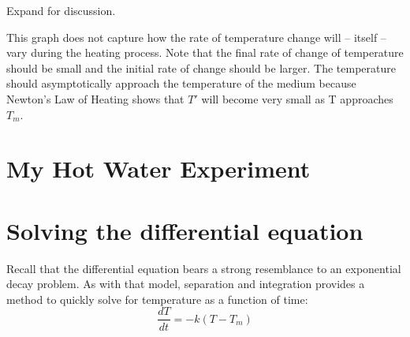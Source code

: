 \documentclass{ximera}
\begin{document}
\begin{problem}
\begin{center}  
\end{center}

Expand for discussion.

 \begin{expandable}
    This graph does not capture how the rate of temperature change will – itself – vary during the heating process.  Note that the final rate of change of temperature should be small and the initial rate of change should be larger.  The temperature should asymptotically approach the temperature of the medium because Newton's Law of Heating shows that $T'$ will become very small as T approaches $T_m$.
  \end{expandable}
 
\end{problem}

\section*{My Hot Water Experiment}

\begin{center}  
\end{center}

\section*{Solving the differential equation}

Recall that the differential equation bears a strong resemblance to an exponential decay problem.  As with that model, separation and integration provides a method to quickly solve for temperature as a function of time:
\[
\frac{dT}{dt}=-k(T-T_m)
\]
\end{document}
